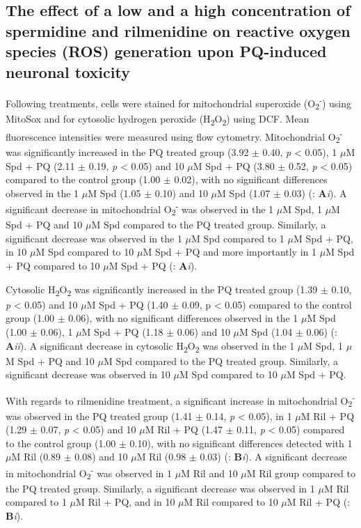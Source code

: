 \subsection{The effect of a low and a high concentration of spermidine and rilmenidine on reactive oxygen species (ROS) generation upon PQ-induced neuronal toxicity}
Following treatments, cells were stained for mitochondrial superoxide (O\textsubscript{2}\textsuperscript{-}) using MitoSox and for cytosolic hydrogen peroxide (H\textsubscript{2}O\textsubscript{2}) using DCF. Mean fluorescence intensities were measured using flow cytometry. Mitochondrial O\textsubscript{2}\textsuperscript{-} was significantly increased in the PQ treated group (3.92 $\pm$ 0.40, \textit{p} < 0.05), 1 $\mu$M Spd + PQ (2.11 $\pm$ 0.19, \textit{p} < 0.05) and 10 $\mu$M Spd + PQ (3.80 $\pm$ 0.52, \textit{p} < 0.05) compared to the control group (1.00 $\pm$ 0.02), with no significant differences observed in the 1 $\mu$M Spd (1.05 $\pm$ 0.10) and 10 $\mu$M Spd (1.07 $\pm$ 0.03) (: \textbf{A}\textit{i}). A significant decrease in mitochondrial O\textsubscript{2}\textsuperscript{-} was observed in the 1 $\mu$M Spd, 1 $\mu$M Spd + PQ and 10 $\mu$M Spd compared to the PQ treated group. Similarly, a significant decrease was observed in the 1 $\mu$M Spd compared to 1 $\mu$M Spd + PQ, in 10 $\mu$M Spd compared to 10 $\mu$M Spd + PQ and more importantly in 1 $\mu$M Spd + PQ compared to 10 $\mu$M Spd + PQ (: \textbf{A}\textit{i}). 

Cytosolic H\textsubscript{2}O\textsubscript{2} was significantly increased in the PQ treated group (1.39 $\pm$ 0.10, \textit{p} < 0.05) and 10 $\mu$M Spd + PQ (1.40 $\pm$ 0.09, p < 0.05) compared to the control group (1.00 $\pm$ 0.06), with no significant differences observed in the 1 $\mu$M Spd (1.00 $\pm$ 0.06), 1 $\mu$M Spd + PQ (1.18 $\pm$ 0.06) and 10 $\mu$M Spd (1.04 $\pm$ 0.06) (: \textbf{A}\textit{ii}). A significant decrease in cytosolic H\textsubscript{2}O\textsubscript{2} was observed in the 1 $\mu$M Spd, 1 $\mu$M Spd + PQ and 10 $\mu$M Spd compared to the PQ treated group. Similarly, a significant decrease was observed in 10 $\mu$M Spd compared to 10 $\mu$M Spd + PQ.

With regards to rilmenidine treatment, a significant increase in mitochondrial O\textsubscript{2}\textsuperscript{-} was observed in the PQ treated group (1.41 $\pm$ 0.14, \textit{p} < 0.05), in 1 $\mu$M Ril + PQ (1.29 $\pm$ 0.07, \textit{p} < 0.05) and 10 $\mu$M Ril + PQ (1.47 $\pm$ 0.11, \textit{p} < 0.05) compared to the control group (1.00 $\pm$ 0.10), with no significant differences detected with 1 $\mu$M Ril (0.89 $\pm$ 0.08) and 10 $\mu$M Ril (0.98 $\pm$ 0.03) (: \textbf{B}\textit{i}). A significant decrease in mitochondrial O\textsubscript{2}\textsuperscript{-} was observed in 1 $\mu$M Ril and 10 $\mu$M Ril group compared to the PQ treated group. Similarly, a significant decrease was observed in 1 $\mu$M Ril compared to 1 $\mu$M Ril + PQ, and in 10 $\mu$M Ril compared to 10 $\mu$M Ril + PQ (: \textbf{B}\textit{i}). 

